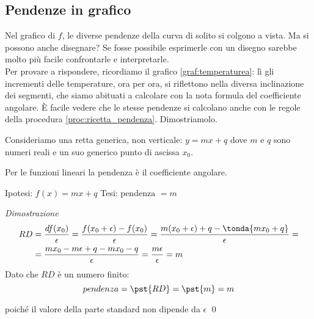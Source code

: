 \subsection{Pendenze in grafico}
\label{subsec:pendenze_grafico}
Nel grafico di \(f\), le diverse pendenze della curva di solito si colgono a 
vista. Ma si possono anche disegnare? Se fosse possibile esprimerle con un 
disegno sarebbe molto più facile confrontarle e interpretarle.\\
Per provare a rispondere, ricordiamo il grafico \ref{graf:temperaturea}: 
lì gli incrementi delle temperature, ora per ora, si riflettono nella 
diversa inclinazione dei segmenti, che siamo abituati a calcolare con la 
nota formula del coefficiente angolare. 
È facile vedere che le stesse pendenze si calcolano anche con le 
regole della procedura \ref{proc:ricetta_pendenza}. 
Dimostriamolo. 

Consideriamo una retta generica, non verticale: \(y=mx+q\) 
dove \(m\) e \(q\) sono numeri reali 
e un suo generico punto di ascissa \(x_0\).
\begin{teorema}
\label{teo:pendenza_retta}
  Per le funzioni lineari la pendenza è il coefficiente angolare.
\end{teorema}
\noindent Ipotesi: \(f(x)=mx+q\) \tab Tesi: \(\text{pendenza }=m\)

\emph{Dimostrazione}
\begin{align*}
RD &=\dfrac{df(x_0)}{\epsilon} =\dfrac{f(x_0+\epsilon)-f(x_0)}{\epsilon}=
     \dfrac{m(x_0+\epsilon)+q-\tonda{mx_0+q}}{\epsilon}=\\
   &= \dfrac{mx_0-m\epsilon+q-mx_0-q}{\epsilon}=
    \dfrac{m\epsilon}{\epsilon}=m
\end{align*}
Dato che \(RD\) è un numero finito:
\[pendenza = \pst{RD}= \pst{m}=m\]

\vspace{-1em} \hspace{25mm} 
poiché il valore della parte standard non dipende da \(\epsilon\) \qed

